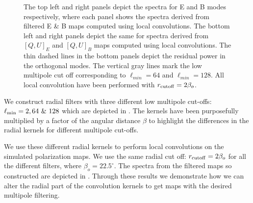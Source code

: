 %
\begin{figure}[!t]
\centering
{}
\caption{The top left and right panels depict the spectra  for E and B modes respectively, where each panel shows the spectra derived from filtered E \& B maps computed using local convolutions. The bottom left and right panels depict the same for spectra derived from $[Q,U]_E$ and $[Q,U]_B$ maps computed using local convolutions. The thin dashed lines in the bottom panels depict the residual power in the orthogonal modes. The vertical gray lines mark the low multipole cut off corresponding to $\ell_{min}=64$ and $\ell_{min}=128$. All local convolution have been performed with $r_{\rm cutoff} =2 \beta_o$.}
\label{fig:filtered_spectra}
\end{figure}
%
We construct radial filters with three different low multipole cut-offs: $\ell_{\rm min} =2,64 ~ \& ~ 128$ which are depicted in . The kernels have been purposefully multiplied by a factor of the angular distance $\beta$ to highlight the differences in the radial kernels for different multipole cut-offs.

We use these different radial kernels to perform local convolutions on the simulated polarization maps. We use the same radial cut off: $r_{\rm cutoff}=2\beta_o$ for all the different filters, where $\beta_o=22.5^{\circ}$. The spectra from the filtered maps so constructed are depicted in . Through these results we demonstrate how we can alter the radial part of the convolution kernels to get maps with the desired multipole filtering. 

